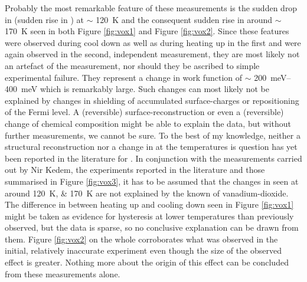 Probably the most remarkable feature of these measurements is the sudden drop in \cpd{} (sudden rise in \wf{}) at $\sim$ \SI{120}{\kelvin} and the consequent sudden rise in \cpd{} around $\sim$ \SI{170}{\kelvin} seen in both Figure \ref{fig:vox1} and Figure \ref{fig:vox2}. Since these features were observed during cool down as well as during heating up in the first and were again observed in the second, independent measurement, they are most likely not an artefact of the measurement, nor should they be ascribed to simple experimental failure. They represent a change in work function of $\sim$ \SIrange{200}{400}{\milli\electronvolt} which is remarkably large. Such changes can most likely not be explained by changes in shielding of accumulated surface-charges or repositioning of the Fermi level. A (reversible) surface-reconstruction or even a (reversible) change of chemical composition might be able to explain the data, but without further measurements, we cannot be sure. To the best of my knowledge, neither a structural reconstruction nor a change in \wf{} at the temperatures is question has yet been reported in the literature for \wvadiox{}. In conjunction with the measurements carried out by Nir Kedem, the experiments reported in the literature and those summarised in Figure \ref{fig:vox3}, it has to be assumed that the changes in \wf{} seen at around \SIlist{120;170}{\kelvin} are not explained by the known \mit{} of vanadium-dioxide. The difference in \cpd{} between heating up and cooling down seen in Figure \ref{fig:vox1} might be taken as evidence for hysteresis at lower temperatures than previously observed, but the data is sparse, so no conclusive explanation can be drawn from them. Figure \ref{fig:vox2} on the whole corroborates what was observed in the initial, relatively inaccurate experiment even though the size of the observed effect is greater. Nothing more about the origin of this effect can be concluded from these measurements alone.\\
